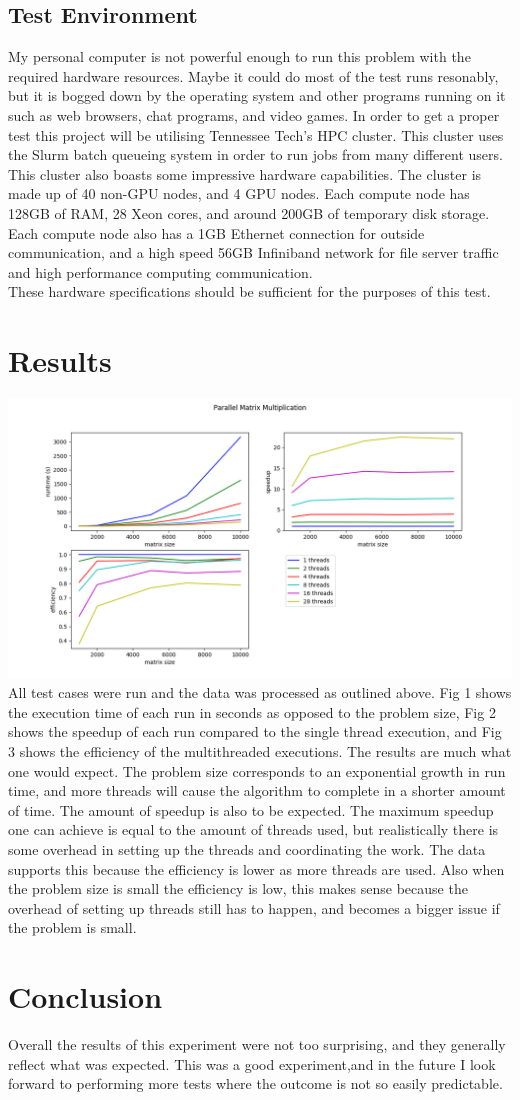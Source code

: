\documentclass{article}
\begin{document}
\subsection{Test Environment}
My personal computer is not powerful enough to run this problem with the required hardware resources.
Maybe it could do most of the test runs resonably, but it is bogged down by the operating 
system and other programs running on it such as web browsers, chat programs, and video games.
In order to get a proper test this project will be utilising Tennessee Tech's HPC cluster. This
cluster uses the Slurm batch queueing system in order to run jobs from many different users.\\
This cluster also boasts some impressive hardware capabilities. The cluster is made up of 40
non-GPU nodes, and 4 GPU nodes. Each compute node has 128GB of RAM, 28 Xeon cores, and around
200GB of temporary disk storage. Each compute node also has a 1GB Ethernet connection for outside
communication, and a high speed 56GB Infiniband network for file server traffic and high performance
computing communication.\\
These hardware specifications should be sufficient for the purposes of this test.

\section{Results}
\includegraphics[width=\textwidth]{speedGraph}
All test cases were run and the data was processed as outlined above. Fig 1 shows the execution time
of each run in seconds as opposed to the problem size, Fig 2 shows the speedup 
of each run compared to the single thread execution, and Fig 3 shows the 
efficiency of the multithreaded executions. The results are much what one 
would expect. The problem size corresponds to an exponential growth in run time,
and more threads will cause the algorithm to complete in a shorter amount of time. 
The amount of speedup is also to be expected. The maximum speedup one can achieve
is equal to the amount of threads used, but realistically there is some overhead
in setting up the threads and coordinating the work. The data supports this because
the efficiency is lower as more threads are used. Also when the problem size is small
the efficiency is low, this makes sense because the overhead of setting up threads
still has to happen, and becomes a bigger issue if the problem is small.

\section{Conclusion}
Overall the results of this experiment were not too surprising, and they generally
reflect what was expected. This was a good experiment,and in the future I look forward to
performing more tests where the outcome is not so easily predictable.
\end{document}
